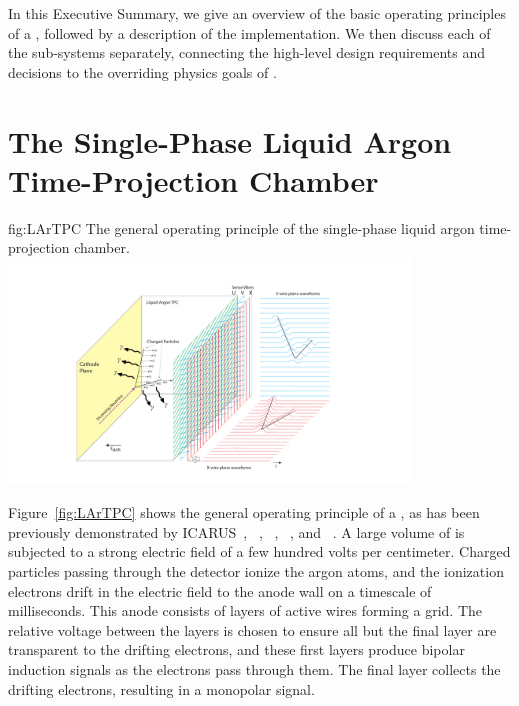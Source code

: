In this Executive Summary, we give an overview of the basic operating principles of a  , followed by a description of the  implementation. We then discuss each of the sub-systems separately, connecting the high-level design requirements and decisions to the overriding physics goals of .

\section{The Single-Phase Liquid Argon Time-Projection Chamber}
\label{sec:fdsp-exec-splar}

\begin{dunefigure}{fig:LArTPC}
{The general operating principle of the single-phase liquid argon time-projection chamber.}
\includegraphics[trim={5cm 0 5cm 0},clip,width=0.8\textwidth]{graphics/TheBoPicture.pdf}
\end{dunefigure}

Figure~\ref{fig:LArTPC} shows the general operating principle of a  , as has been previously demonstrated by
ICARUS~\cite{Icarus-T600},
~\cite{Anderson:2012vc}, ~\cite{microboone}, ~\cite{Cavanna:2014iqa}, and ~\cite{Abi:2017aow}. A large volume of  is subjected to a strong electric field of a few hundred volts per centimeter. Charged particles passing through the detector ionize the argon atoms, and the ionization electrons drift in the electric field to the anode wall on a timescale of milliseconds. This anode consists of layers of active wires forming a grid. The relative voltage between the layers is chosen to ensure all but the final layer are transparent to the drifting electrons, and these first layers produce bipolar induction signals as the electrons pass through them. The final layer collects the drifting electrons, resulting in a monopolar signal.

